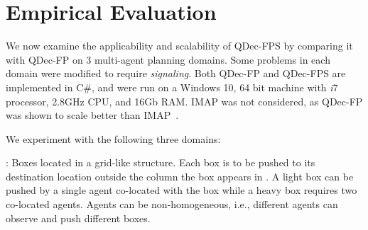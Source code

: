 \documentclass[letterpaper]{article} %
\theoremstyle{definition}
\begin{document}


\section{Empirical Evaluation}

We now examine the applicability and scalability of QDec-FPS by comparing it with QDec-FP on 3 multi-agent planning domains.
Some problems in each domain were modified to require \emph{signaling}.
%
Both QDec-FP and QDec-FPS are  implemented in C\#, and were run on a Windows 10, 64 bit machine with \emph{i}7 processor, 2.8GHz CPU, and 16Gb RAM.
IMAP was not considered, as QDec-FP was  shown to scale better than IMAP~\citep{IMAP}.

We experiment with the following three domains:

: Boxes located in a grid-like structure. Each box is to be pushed to its destination location
outside the column the box appears in \citep{BrafmanSZ13}.
A light box can be pushed by a single agent co-located with the box while a heavy box requires two co-located agents.
Agents can be non-homogeneous, i.e., different agents can observe and push different boxes.
\end{document}
